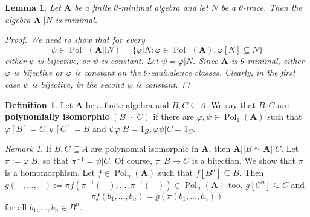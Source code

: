 \documentclass{amsart}
\theoremstyle{plain}
\newtheorem{lemma}[theorem]{Lemma}
\theoremstyle{definition}
\newtheorem{definition}[theorem]{Definition}
\theoremstyle{remark}
\newtheorem{remark}[theorem]{Remark}
\def\phi{\varphi}
\DeclareMathOperator{\Pol}{Pol}
\begin{document}
\begin{lemma}
    Let $\mathbf{A}$ be a finite $\theta$-minimal algebra and let $N$ be a $\theta$-trace. 
    Then the algebra $\mathbf{A}||N$ is minimal.
    \begin{proof}
        We need to show that for every 
        \begin{equation*}
            \psi \in \Pol_1(\mathbf{A}||N) = \{ \phi|N : \phi \in \Pol_1(\mathbf{A}), \phi[N] \subseteq N\}
        \end{equation*}
        either $\psi$ is bijective, or $\psi$ is constant. 
        Let $\psi = \phi|N$. 
        Since $\mathbf{A}$ is $\theta$-minimal, either $\phi$ is bijective or $\phi$ is constant on the $\theta$-equivalence classes. 
        Clearly, in the first case $\psi$ is bijective, in the second $\psi$ is constant.  
    \end{proof}  
\end{lemma}

\begin{definition}
    Let $\mathbf{A}$ be a finite algebra and $B,C \subseteq A$. 
    We say that $B,C$ are \textbf{polynomially isomorphic} $(B \sim C)$ if there are $\phi, \psi \in \Pol_1(\mathbf{A})$ such that 
    $\phi[B] = C, \psi[C]=B$ and $\psi \phi | B = 1_B, \phi \psi | C = 1_C$. 
\end{definition}

\begin{remark}
    If $B,C \subseteq A$ are polynomial isomorphic in $\mathbf{A}$, then $\mathbf{A}||B \simeq \mathbf{A}||C$. 
    Let $\pi:=\phi|B$, so that $\pi^{-1}=\psi|C$.    
    Of course, $\pi: B \to C$ is a bijection. 
    We show that $\pi$ is a homomorphism. 
    Let $f \in \Pol_n(\mathbf{A})$ such that $f[B^n] \subseteq B$. 
    Then $g(-, \ldots, -):=\pi f(\pi^{-1}(-), \ldots, \pi^{-1}(-)) \in \Pol_n(\mathbf{A})$ too, $g[C^n] \subseteq C$ and 
    \begin{equation*}
        \pi f(b_1, \ldots, b_n) = g(\pi(b_1, \ldots, b_n))
    \end{equation*}
    for all $b_1, \ldots, b_n \in B^n$. 
\end{remark}
\end{document}
